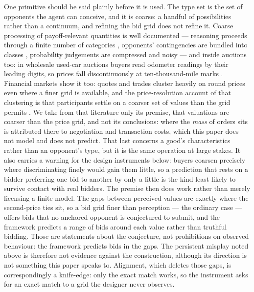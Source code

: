\documentclass[12pt]{article}
\theoremstyle{definition}
\begin{document}
One primitive should be said plainly before it is used. The type set is the set of opponents the agent can conceive, and it is coarse: a handful of possibilities rather than a continuum, and refining the bid grid does not refine it. Coarse processing of payoff-relevant quantities is well documented --- reasoning proceeds through a finite number of categories \citep{mss2008coarse}, opponents' contingencies are bundled into classes \citep{jehiel2005analogy}, probability judgements are compressed and noisy \citep{enke2023cognitive} --- and inside auctions too: in wholesale used-car auctions buyers read odometer readings by their leading digits, so prices fall discontinuously at ten-thousand-mile marks \citep{lacetera2012heuristic}. Financial markets show it too: quotes and trades cluster heavily on round prices even where a finer grid is available, and the price-resolution account of that clustering is that participants settle on a coarser set of values than the grid permits \citep{harris1991stock}. We take from that literature only its premise, that valuations are coarser than the price grid, and not its conclusions: where the \emph{mass} of orders sits is attributed there to negotiation and transaction costs, which this paper does not model and does not predict. That last concerns a good's characteristics rather than an opponent's type, but it is the same operation at large stakes. It also carries a warning for the design instruments below: buyers coarsen precisely where discriminating finely would gain them little, so a prediction that rests on a bidder preferring one bid to another by only a little is the kind least likely to survive contact with real bidders. The premise then does work rather than merely licensing a finite model. The gaps between perceived values are exactly where the second-price ties sit, so a bid grid finer than perception --- the ordinary case --- offers bids that no anchored opponent is conjectured to submit, and the framework predicts a range of bids around each value rather than truthful bidding. Those are statements about the conjecture, not prohibitions on observed behaviour: the framework predicts bids in the gaps. The persistent misplay noted above is therefore not evidence against the construction, although its direction is not something this paper speaks to. Alignment, which deletes those gaps, is correspondingly a knife-edge: only the exact match works, so the instrument asks for an exact match to a grid the designer never observes.
\end{document}

